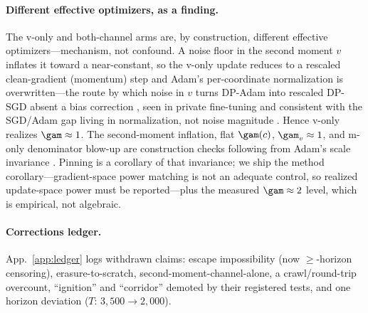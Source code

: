 \paragraph{Different effective optimizers, as a finding.}
The v-only and both-channel arms are, by construction, different effective optimizers---mechanism, not confound. A noise floor in the second moment $v$ inflates it toward a near-constant, so the v-only update reduces to a rescaled clean-gradient (momentum) step and Adam's per-coordinate normalization is overwritten---the route by which noise in $v$ turns DP-Adam into rescaled DP-SGD absent a bias correction \citep{dpadambc}, seen in private fine-tuning \citep{litramer} and consistent with the SGD/Adam gap living in normalization, not noise magnitude \citep{kunstner}. Hence v-only realizes $\gam\approx1$. The second-moment inflation, flat $\gam(c)$, $\gam_v\approx1$, and m-only denominator blow-up are construction checks following from Adam's scale invariance \citep{adam}. Pinning is a corollary of that invariance; we ship the method corollary---gradient-space power matching is not an adequate control, so realized update-space power must be reported---plus the measured $\gam\approx2$ level, which is empirical, not algebraic.

\paragraph{Corrections ledger.}
App.~\ref{app:ledger} logs withdrawn claims: escape impossibility (now ${\geq}$-horizon censoring), erasure-to-scratch, second-moment-channel-alone, a crawl/round-trip overcount, ``ignition'' and ``corridor'' demoted by their registered tests, and one horizon deviation ($T$: $3{,}500\!\to\!2{,}000$).